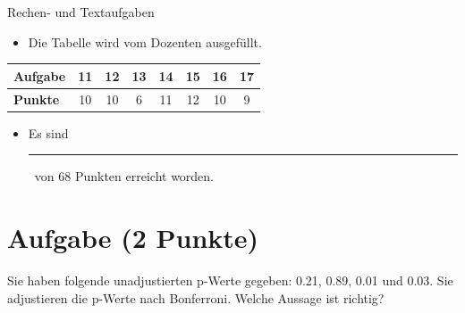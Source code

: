 \documentclass[a4paper, 10pt]{scrartcl}\usepackage[]{graphicx}\usepackage[]{xcolor}
\begin{document}
\begin{graybox}{Rechen- und Textaufgaben}
  \begin{itemize}
  \item Die Tabelle wird vom Dozenten ausgef{\"u}llt.
  \end{itemize}
  \begin{center}
    \large
    \begin{tabular}{|l|c|c|c|c|c|c|c|}
      \hline
      \textbf{Aufgabe} & 11 & 12 & 13 & 14 & 15 & 16 & 17 \strut\\
      \hline
      \textbf{Punkte} & 
      \hspace{1Ex}\Large\textcolor{gray!70}{10}\hspace{1Ex}  & 
      \hspace{1Ex}\Large\textcolor{gray!70}{10}\hspace{1Ex}  & 
      \hspace{1Ex}\Large\textcolor{gray!70}{6}\hspace{1Ex}  & 
      \hspace{1Ex}\Large\textcolor{gray!70}{11}\hspace{1Ex}  & 
      \hspace{1Ex}\Large\textcolor{gray!70}{12}\hspace{1Ex}  & 
      \hspace{1Ex}\Large\textcolor{gray!70}{10}\hspace{1Ex}  & 
      \hspace{1Ex}\Large\textcolor{gray!70}{9}\hspace{1Ex} \strut\\
      \hline
  \end{tabular}
\end{center}
\begin{itemize}
\item Es sind \rule[0ex]{2em}{.4pt}\, von 68 Punkten erreicht worden.
\end{itemize}
\end{graybox}

\clearpage

\section{Aufgabe \hfill (2 Punkte)}



Sie haben folgende unadjustierten p-Werte gegeben: 0.21, 0.89, 0.01 und 0.03. Sie adjustieren die p-Werte nach
Bonferroni. Welche Aussage ist richtig?
\end{document}
